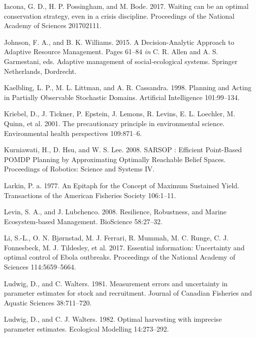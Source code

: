 \documentclass[3p]{elsarticle} %
\begin{document}
\leavevmode\hypertarget{ref-Iacona2017}{}%
Iacona, G. D., H. P. Possingham, and M. Bode. 2017. Waiting can be an
optimal conservation strategy, even in a crisis discipline. Proceedings
of the National Academy of Sciences 201702111.

\leavevmode\hypertarget{ref-Johnson2015}{}%
Johnson, F. A., and B. K. Williams. 2015. A Decision-Analytic Approach
to Adaptive Resource Management. Pages 61--84 \emph{in} C. R. Allen and
A. S. Garmestani, eds. Adaptive management of social-ecological systems.
Springer Netherlands, Dordrecht.

\leavevmode\hypertarget{ref-Kaelbling1998}{}%
Kaelbling, L. P., M. L. Littman, and A. R. Cassandra. 1998. Planning and
Acting in Partially Observable Stochastic Domains. Artificial
Intelligence 101:99--134.

\leavevmode\hypertarget{ref-Kriebel2001}{}%
Kriebel, D., J. Tickner, P. Epstein, J. Lemons, R. Levins, E. L.
Loechler, M. Quinn, et al. 2001. The precautionary principle in
environmental science. Environmental health perspectives 109:871--6.

\leavevmode\hypertarget{ref-Kurniawati2008}{}%
Kurniawati, H., D. Hsu, and W. S. Lee. 2008. SARSOP : Efficient
Point-Based POMDP Planning by Approximating Optimally Reachable Belief
Spaces. Proceedings of Robotics: Science and Systems IV.

\leavevmode\hypertarget{ref-Larkin1977}{}%
Larkin, P. a. 1977. An Epitaph for the Concept of Maximum Sustained
Yield. Transactions of the American Fisheries Society 106:1--11.

\leavevmode\hypertarget{ref-Levin2008}{}%
Levin, S. A., and J. Lubchenco. 2008. Resilience, Robustness, and Marine
Ecosystem-based Management. BioScience 58:27--32.

\leavevmode\hypertarget{ref-Li2017}{}%
Li, S.-L., O. N. Bjørnstad, M. J. Ferrari, R. Mummah, M. C. Runge, C. J.
Fonnesbeck, M. J. Tildesley, et al. 2017. Essential information:
Uncertainty and optimal control of Ebola outbreaks. Proceedings of the
National Academy of Sciences 114:5659--5664.

\leavevmode\hypertarget{ref-Ludwig1981}{}%
Ludwig, D., and C. Walters. 1981. Measurement errors and uncertainty in
parameter estimates for stock and recruitment. Journal of Canadian
Fisheries and Aquatic Sciences 38:711--720.

\leavevmode\hypertarget{ref-Ludwig1982}{}%
Ludwig, D., and C. J. Walters. 1982. Optimal harvesting with imprecise
parameter estimates. Ecological Modelling 14:273--292.
\end{document}
